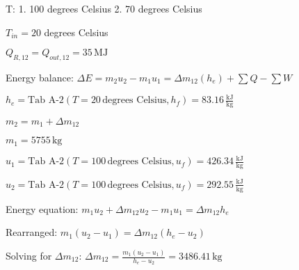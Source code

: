 T:  
1. 100 degrees Celsius  
2. 70 degrees Celsius  

\( T_{in} = 20 \) degrees Celsius  

\( Q_{R,12} = Q_{out,12} = 35 \, \text{MJ} \)  

Energy balance:  
\( \Delta E = m_2 u_2 - m_1 u_1 = \Delta m_{12} (h_e) + \sum Q - \sum W \)  

\( h_e = \text{Tab A-2} (T = 20 \, \text{degrees Celsius}, h_f) = 83.16 \, \frac{\text{kJ}}{\text{kg}} \)  

\( m_2 = m_1 + \Delta m_{12} \)  

\( m_1 = 5755 \, \text{kg} \)  

\( u_1 = \text{Tab A-2} (T = 100 \, \text{degrees Celsius}, u_f) = 426.34 \, \frac{\text{kJ}}{\text{kg}} \)  

\( u_2 = \text{Tab A-2} (T = 100 \, \text{degrees Celsius}, u_f) = 292.55 \, \frac{\text{kJ}}{\text{kg}} \)  

Energy equation:  
\( m_1 u_2 + \Delta m_{12} u_2 - m_1 u_1 = \Delta m_{12} h_e \)  

Rearranged:  
\( m_1 (u_2 - u_1) = \Delta m_{12} (h_e - u_2) \)  

Solving for \( \Delta m_{12} \):  
\( \Delta m_{12} = \frac{m_1 (u_2 - u_1)}{h_e - u_2} = 3486.41 \, \text{kg} \)